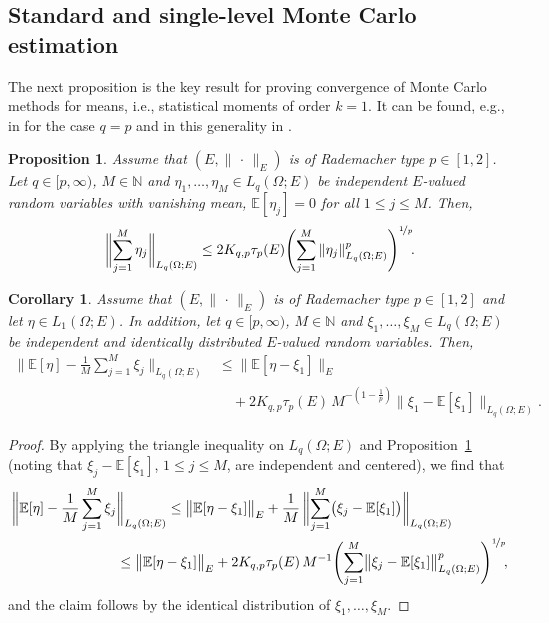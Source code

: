 \documentclass[reqno]{amsart}
\numberwithin{equation}{section}
\newcommand{\bbE}{\mathbb{E}}
\newcommand{\bbN}{\mathbb{N}}
\newcommand{\norm}[2]{     \| #1       \|_{ #2 }}
\newtheorem{proposition}[lemma]{Proposition}
\newtheorem{corollary}[lemma]{Corollary}
\theoremstyle{remark}
\theoremstyle{definition}
\begin{document}
\subsection{Standard and single-level Monte Carlo estimation} 
\label{subsec:slmc} 

The next proposition is the key result 
for proving convergence 
of Monte Carlo methods for means, 
i.e., statistical 
moments of order $k=1$. 
It can be found, e.g., in \cite[Proposition~9.11]{LedouxTalagrand2011} 
for the case $q=p$ and 
in this generality in \cite[Proposition~5.10]{CoxEtAl2021}. 

\begin{proposition}\label{prop:MC-1} 
	Assume that  
	$(E,\norm{\,\cdot\,}{E})$ 
	is of Rademacher type $p\in[1,2]$. 
	Let $q\in[p,\infty)$, $M\in\bbN$ 
	and $\eta_1,\ldots,\eta_M \in L_q(\Omega;E)$ be 
	independent $E$-valued random variables 
	with vanishing mean, 
	$\bbE[\eta_j]=0$ for all $1\leq j \leq M$. 
	Then, 
	\[ 
	\biggl\| 
	\sum_{j=1}^M 
	\eta_j 
	\biggr\|_{L_q(\Omega;E)} 
	\leq 
	2 K_{q,p} \tau_p(E) 
	\Biggl( 
	\sum_{j=1}^M
	\norm{ \eta_j }{L_q(\Omega; E)}^p 
	\Biggr)^{\nicefrac{1}{p}} \!.
	\]
\end{proposition}  

\begin{corollary}\label{cor:MC-1} 
	Assume that  
	$(E,\norm{\,\cdot\,}{E})$ 
	is of Rademacher type $p\in[1,2]$ 
	and let $\eta\in L_1(\Omega;E)$. 
	In addition, let $q\in[p,\infty)$, $M\in\bbN$ 
	and $\xi_1,\ldots,\xi_M\in L_q(\Omega;E)$ be 
	independent and identically distributed 
	$E$-valued random variables.  
	Then, 
	\begin{align*} 
	\biggl\| 
	\bbE[\eta] 
	- \frac{1}{M}
	\sum_{j=1}^M 
	\xi_j 
	\biggr\|_{L_q(\Omega;E)} 
	&\leq 
	\bigl\| \bbE[ \eta - \xi_1] \bigr\|_{E}  
	\\
	&\quad 
	+ 
	2 K_{q,p} \tau_p(E) \, 
	M^{-\left( 1-\frac{1}{p} \right)} 
	\bigl\| \xi_1 - \bbE[\xi_1] \bigr\|_{L_q(\Omega; E)}. 
	\end{align*}
\end{corollary} 

\begin{proof}
	By applying the triangle inequality on $L_q(\Omega;E)$ 
	and Proposition~\ref{prop:MC-1} 
	(noting that $\xi_j - \bbE[\xi_1]$, $1\leq j\leq M$, 
	are independent and centered), 
	we find that 
	\begin{align*} 
	\biggl\| 
	\bbE[\eta] - \frac{1}{M} \sum_{j=1}^M \xi_j 
	&\biggr\|_{L_q(\Omega;E)} 
	\leq 
	\bigl\| \bbE[ \eta - \xi_1] \bigr\|_{E}  
	+ 
	\frac{1}{M} \, 
	\biggl\| 
	\sum_{j=1}^M 
	\bigl( \xi_j - \bbE[\xi_1] \bigr)
	\biggr\|_{L_q(\Omega;E)} 
	\\
	&\leq 
	\bigl\| \bbE[ \eta - \xi_1] \bigr\|_{E}  
	+ 
	2 K_{q,p} \tau_p(E) \, 
	M^{-1}
	\Biggl( 
	\sum_{j=1}^M
	\bigl\| \xi_j - \bbE[\xi_1] \bigr\|_{L_q(\Omega; E)}^p 
	\Biggr)^{\nicefrac{1}{p}} \!, 
	\end{align*} 	
	and the claim follows by 
	the identical distribution 
	of $\xi_1,\ldots,\xi_M$. 
\end{proof}
\end{document}
